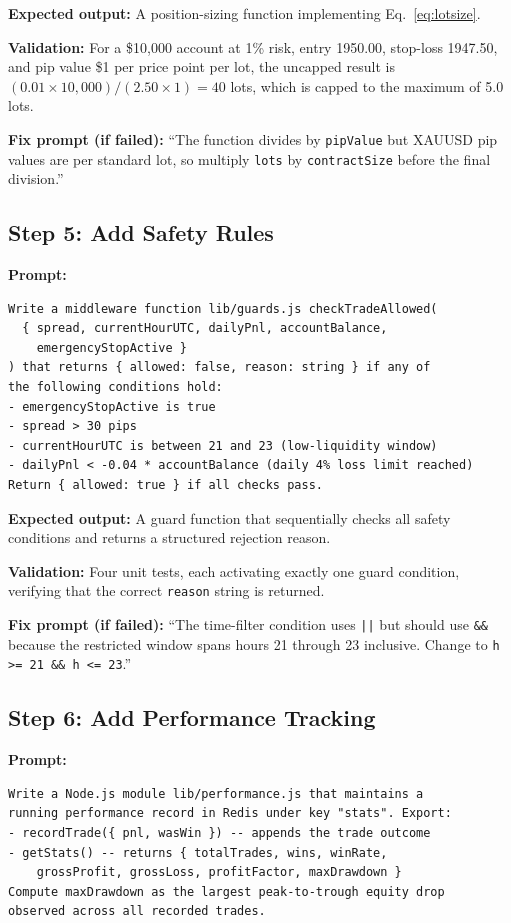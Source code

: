 \documentclass[conference]{IEEEtran}
\begin{document}
\textbf{Expected output:} A position-sizing function implementing
Eq.~\ref{eq:lotsize}.

\textbf{Validation:} For a \$10{,}000 account at 1\% risk, entry
1950.00, stop-loss 1947.50, and pip value \$1 per price point per lot,
the uncapped result is
$(0.01 \times 10{,}000) / (2.50 \times 1) = 40$ lots, which is capped
to the maximum of 5.0 lots.

\textbf{Fix prompt (if failed):} ``The function divides by
\texttt{pipValue} but XAUUSD pip values are per standard lot, so
multiply \texttt{lots} by \texttt{contractSize} before the final
division.''

\subsection{Step 5: Add Safety Rules}

\textbf{Prompt:}
\begin{lstlisting}
Write a middleware function lib/guards.js checkTradeAllowed(
  { spread, currentHourUTC, dailyPnl, accountBalance,
    emergencyStopActive }
) that returns { allowed: false, reason: string } if any of
the following conditions hold:
- emergencyStopActive is true
- spread > 30 pips
- currentHourUTC is between 21 and 23 (low-liquidity window)
- dailyPnl < -0.04 * accountBalance (daily 4% loss limit reached)
Return { allowed: true } if all checks pass.
\end{lstlisting}

\textbf{Expected output:} A guard function that sequentially checks
all safety conditions and returns a structured rejection reason.

\textbf{Validation:} Four unit tests, each activating exactly one
guard condition, verifying that the correct \texttt{reason} string
is returned.

\textbf{Fix prompt (if failed):} ``The time-filter condition uses
\texttt{||} but should use \texttt{\&\&} because the restricted
window spans hours 21 through 23 inclusive.  Change to
\texttt{h >= 21 \&\& h <= 23}.''

\subsection{Step 6: Add Performance Tracking}

\textbf{Prompt:}
\begin{lstlisting}
Write a Node.js module lib/performance.js that maintains a
running performance record in Redis under key "stats". Export:
- recordTrade({ pnl, wasWin }) -- appends the trade outcome
- getStats() -- returns { totalTrades, wins, winRate,
    grossProfit, grossLoss, profitFactor, maxDrawdown }
Compute maxDrawdown as the largest peak-to-trough equity drop
observed across all recorded trades.
\end{lstlisting}
\end{document}
